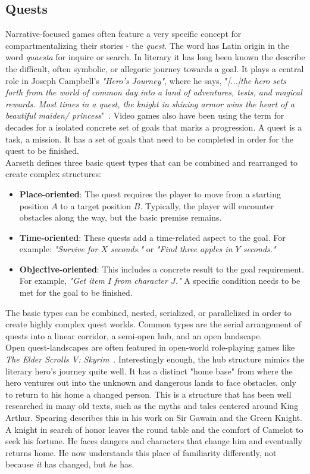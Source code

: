 \subsection{Quests}
Narrative-focused games often feature a very specific concept for compartmentalizing their stories - the \textit{quest}. The word has Latin origin in the word \textit{quaesta} for inquire or search. In literary it has long been known the describe the difficult, often symbolic, or allegoric journey towards a goal. It plays a central role in Joseph Campbell's \textit{"Hero's Journey"}, where he says, "\textit{[...]the hero sets forth from the world of common day into a land of adventures, tests, and magical rewards. Most times in a quest, the knight in shining armor wins the heart of a beautiful maiden/ princess}"~\cite{Campbell2008}. Video games also have been using the term for decades for a isolated concrete set of goals that marks a progression. A quest is a task, a mission. It has a set of goals that need to be completed in order for the quest to be finished.\\
Aarseth defines three basic quest types that can be combined and rearranged to create complex structures:
\begin{itemize}
	\item \textbf{Place-oriented}: The quest requires the player to move from a starting position $A$ to a target position $B$. Typically, the player will encounter obstacles along the way, but the basic premise remains.
	\item \textbf{Time-oriented}: These quests add a time-related aspect to the goal. For example: \textit{"Survive for $X$ seconds."} or \textit{"Find three apples in $Y$ seconds."}
	\item \textbf{Objective-oriented}: This includes a concrete result to the goal requirement. For example, \textit{"Get item $I$ from character $J$."} A specific condition needs to be met for the goal to be finished.
\end{itemize} 
The basic types can be combined, nested, serialized, or parallelized in order to create highly complex quest worlds. Common types are the serial arrangement of quests into a linear corridor, a semi-open hub, and an open landscape.~\cite{Aarseth2005}\\
Open quest-landscapes are often featured in open-world role-playing games like \textit{The Elder Scrolls V: Skyrim}~\cite{skyrim}. Interestingly enough, the hub structure mimics the literary hero's journey quite well. It has a distinct "home base" from where the hero ventures out into the unknown and dangerous lands to face obstacles, only to return to his home a changed person. This is a structure that has been well researched in many old texts, such as the myths and tales centered around King Arthur. Spearing describes this in his work on Sir Gawain and the Green Knight. A knight in search of honor leaves the round table and the comfort of Camelot to seek his fortune. He faces dangers and characters that change him and eventually returns home. He now understands this place of familiarity differently, not because \textit{it} has changed, but \textit{he} has.~\cite{Spearing1994}\\
